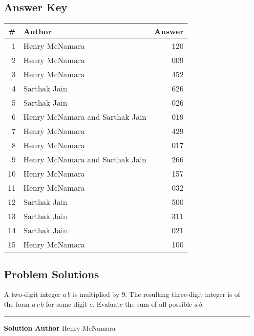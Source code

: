 \documentclass[11pt]{scrartcl}
\newcommand*{\problemfont}{\sffamily\bfseries}
\begin{document}
\subsection{Answer Key}

\begin{center}
    \begin{tabular}{r l | r}
        \# & Author & Answer \\
        \hline
        1 & Henry McNamara & 120 \\
        2 & Henry McNamara & 009 \\
        3 & Henry McNamara & 452 \\
        4 & Sarthak Jain & 626 \\
        5 & Sarthak Jain & 026 \\
        6 & Henry McNamara and Sarthak Jain & 019 \\
        7 & Henry McNamara & 429 \\
        8 & Henry McNamara & 017 \\
        9 & Henry McNamara and Sarthak Jain & 266 \\
        10 & Henry McNamara & 157 \\
        11 & Henry McNamara & 032 \\
        12 & Sarthak Jain & 500 \\
        13 & Sarthak Jain & 311 \\
        14 & Sarthak Jain & 021 \\
        15 & Henry McNamara & 100 \\
    \end{tabular}
\end{center}

\pagebreak

\subsection{Problem Solutions}

\begin{problem}
    A two-digit integer $\underline{a} \, \underline{b}$ is multiplied by 9. The resulting three-digit integer is of the form $\underline{a} \, \underline{c} \, \underline{b}$ for some digit $c$. Evaluate the sum of all possible $\underline{a} \, \underline{b}$.
\end{problem}

\vspace{-\baselineskip}\rule{\textwidth}{0.4pt}

{\problemfont Solution Author} Henry McNamara
\end{document}
